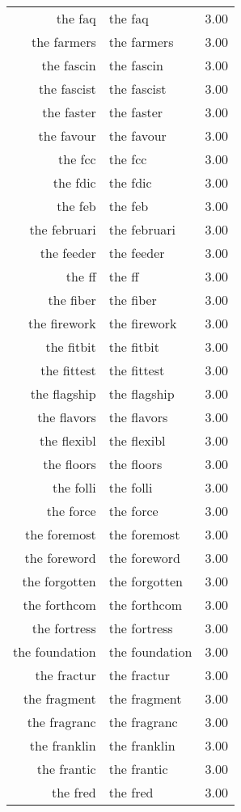 \begin{table}[ht]
\begin{tabular}{rlr}
  the faq & the faq & 3.00 \\ 
  the farmers & the farmers & 3.00 \\ 
  the fascin & the fascin & 3.00 \\ 
  the fascist & the fascist & 3.00 \\ 
  the faster & the faster & 3.00 \\ 
  the favour & the favour & 3.00 \\ 
  the fcc & the fcc & 3.00 \\ 
  the fdic & the fdic & 3.00 \\ 
  the feb & the feb & 3.00 \\ 
  the februari & the februari & 3.00 \\ 
  the feeder & the feeder & 3.00 \\ 
  the ff & the ff & 3.00 \\ 
  the fiber & the fiber & 3.00 \\ 
  the firework & the firework & 3.00 \\ 
  the fitbit & the fitbit & 3.00 \\ 
  the fittest & the fittest & 3.00 \\ 
  the flagship & the flagship & 3.00 \\ 
  the flavors & the flavors & 3.00 \\ 
  the flexibl & the flexibl & 3.00 \\ 
  the floors & the floors & 3.00 \\ 
  the folli & the folli & 3.00 \\ 
  the force & the force & 3.00 \\ 
  the foremost & the foremost & 3.00 \\ 
  the foreword & the foreword & 3.00 \\ 
  the forgotten & the forgotten & 3.00 \\ 
  the forthcom & the forthcom & 3.00 \\ 
  the fortress & the fortress & 3.00 \\ 
  the foundation & the foundation & 3.00 \\ 
  the fractur & the fractur & 3.00 \\ 
  the fragment & the fragment & 3.00 \\ 
  the fragranc & the fragranc & 3.00 \\ 
  the franklin & the franklin & 3.00 \\ 
  the frantic & the frantic & 3.00 \\ 
  the fred & the fred & 3.00 \\ 

\end{tabular}
\end{table}
